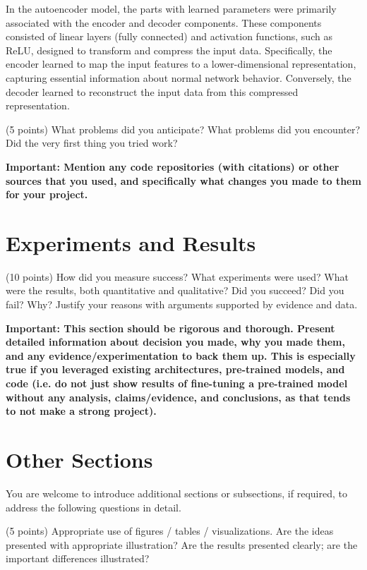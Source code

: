 \documentclass[10pt,twocolumn,letterpaper]{article}
\begin{document}
In the autoencoder model, the parts with learned parameters were primarily associated with the encoder and decoder components. These components consisted of linear layers (fully connected) and activation functions, such as ReLU, designed to transform and compress the input data. 
Specifically, the encoder learned to map the input features to a lower-dimensional representation, capturing essential information about normal network behavior. Conversely, the decoder learned to reconstruct the input data from this compressed representation.

(5 points) What problems did you anticipate? What problems did you encounter? Did the very first thing you tried work? 

\textbf{Important: Mention any code repositories (with citations) or other sources that you used, and specifically what changes you made to them for your project. }

\section{Experiments and Results}

(10 points) How did you measure success? What experiments were used? What were the results, both quantitative and qualitative? Did you succeed? Did you fail? Why? Justify your reasons with arguments supported by evidence and data.

\textbf{Important: This section should be rigorous and thorough. Present detailed information about decision you made, why you made them, and any evidence/experimentation to back them up. This is especially true if you leveraged existing architectures, pre-trained models, and code (i.e. do not just show results of fine-tuning a pre-trained model without any analysis, claims/evidence, and conclusions, as that tends to not make a strong project). }

\section{Other Sections}


You are welcome to introduce additional sections or subsections, if required, to address the following questions in detail. 

(5 points) Appropriate use of figures / tables / visualizations. Are the ideas presented with appropriate illustration? Are the results presented clearly; are the important differences illustrated? 
\end{document}
